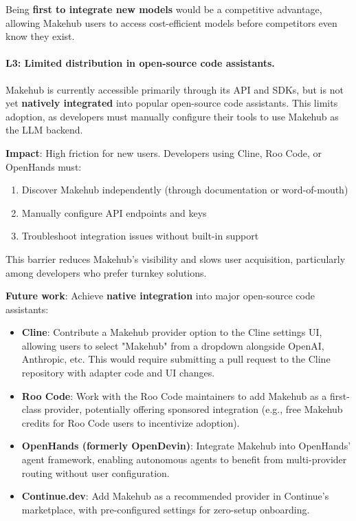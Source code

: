 \documentclass[english]{article}
\begin{document}
Being \textbf{first to integrate new models} would be a competitive advantage, allowing Makehub users to access cost-efficient models before competitors even know they exist.

\paragraph{L3: Limited distribution in open-source code assistants.}

Makehub is currently accessible primarily through its API and SDKs, but is not yet \textbf{natively integrated} into popular open-source code assistants. This limits adoption, as developers must manually configure their tools to use Makehub as the LLM backend.

\textbf{Impact}: High friction for new users. Developers using Cline, Roo Code, or OpenHands must:
\begin{enumerate}
    \item Discover Makehub independently (through documentation or word-of-mouth)
    \item Manually configure API endpoints and keys
    \item Troubleshoot integration issues without built-in support
\end{enumerate}

This barrier reduces Makehub's visibility and slows user acquisition, particularly among developers who prefer turnkey solutions.

\textbf{Future work}: Achieve \textbf{native integration} into major open-source code assistants:
\begin{itemize}
    \item \textbf{Cline}: Contribute a Makehub provider option to the Cline settings UI, allowing users to select "Makehub" from a dropdown alongside OpenAI, Anthropic, etc. This would require submitting a pull request to the Cline repository with adapter code and UI changes.
    \item \textbf{Roo Code}: Work with the Roo Code maintainers to add Makehub as a first-class provider, potentially offering sponsored integration (e.g., free Makehub credits for Roo Code users to incentivize adoption).
    \item \textbf{OpenHands (formerly OpenDevin)}: Integrate Makehub into OpenHands' agent framework, enabling autonomous agents to benefit from multi-provider routing without user configuration.
    \item \textbf{Continue.dev}: Add Makehub as a recommended provider in Continue's marketplace, with pre-configured settings for zero-setup onboarding.
\end{itemize}
\end{document}
